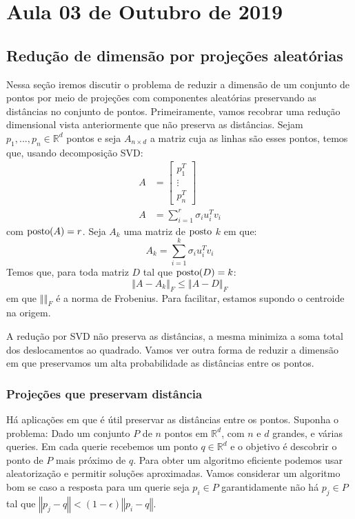 \section{Aula 03 de Outubro de 2019}
\label{2019_10_03}


\subsection{Redução de dimensão por projeções aleatórias}
Nessa seção iremos discutir o problema de reduzir a dimensão de um conjunto de pontos por meio de projeções com componentes aleatórias preservando as distâncias no conjunto de pontos. Primeiramente, vamos recobrar uma redução dimensional vista anteriormente que não preserva as distâncias.
Sejam $p_1,...,p_n \in \mathbb{R}^d$ pontos e seja $A_{n \times d}$ a matriz cuja as linhas são esses pontos, temos que, usando decomposição SVD:
\begin{align*}
A &=
  \begin{bmatrix}
    p_1^T \\
    \vdots \\
    p_n^T
  \end{bmatrix}\\
   A &= \sum\limits_{i = 1}^r \sigma_i u_i^T v_i    
\end{align*}
com $\operatorname{posto}(A) = r$. Seja $A_k$ uma matriz de $\operatorname{posto}$ $k$ em que: 
\begin{equation*}
    A_k = \sum\limits_{i = 1}^k \sigma_i u_i^T v_i    
\end{equation*}
Temos que, para toda matriz $D$ tal que $\operatorname{posto}(D)=k$:
\begin{equation*}
    \left\Vert A - A_k \right\Vert_F \leq \left\Vert A - D \right\Vert_F
\end{equation*}
em que $\left\Vert \right\Vert_F$ é a norma de Frobenius. Para facilitar, estamos supondo o centroide na origem.


A redução por SVD não preserva as distâncias, a mesma minimiza a soma total dos deslocamentos ao quadrado. Vamos ver outra forma de reduzir a dimensão em que preservamos um alta probabilidade as distâncias entre os pontos.
\subsubsection{Projeções que preservam distância} Há aplicações em que é útil preservar as distâncias entre os pontos. Suponha o problema: Dado um conjunto $P$ de $n$ pontos em $\mathbb{R}^d$, com $n$ e $d$ grandes, e várias queries. Em cada querie recebemos um ponto $q \in \mathbb{R}^d$ e o objetivo é descobrir o ponto de $P$ mais próximo de $q$. Para obter um algoritmo eficiente podemos usar aleatorização e permitir soluções aproximadas. Vamos considerar um algoritmo bom se caso a resposta para um querie seja $p_i \in P$ garantidamente não há $p_j \in P$ tal que $\left\Vert p_j - q \right\Vert <(1 - \epsilon) \left\Vert p_i - q \right\Vert$. 


